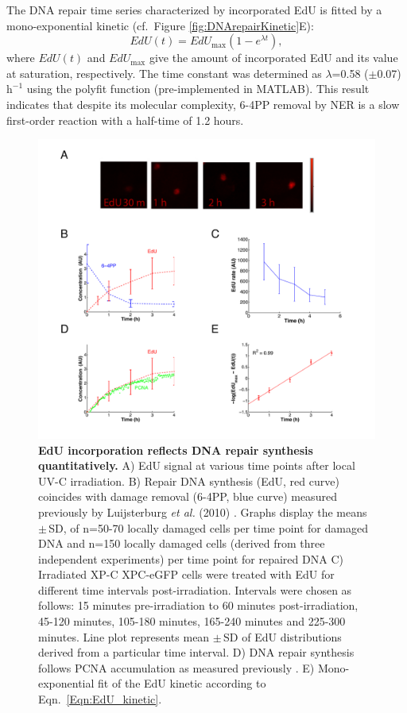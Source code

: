The DNA repair time series characterized by incorporated EdU is fitted by a mono-exponential kinetic (cf.\ Figure \ref{fig:DNArepairKinetic}E):
\begin{equation}
EdU(t) = EdU_\text{max}(1 - e^{\lambda t}),
\label{Eqn:EdU_kinetic}
\end{equation}  
where $EdU(t)$ and $EdU_{\text{max}}$ give the amount of incorporated EdU and its value at saturation, respectively. The time constant was determined as $\lambda$=0.58 ($\pm$0.07) $\text{h}^{-\text{1}}$ using the polyfit function (pre-implemented in MATLAB). This result indicates that despite its molecular complexity, 6-4PP removal by NER is a slow first-order reaction with a half-time of 1.2 hours. \\
        
\begin{figure}[b!]
\begin{center}
\includegraphics[width=1\textwidth]{Abbildungen/figure2_4.pdf}
\caption{\textbf{EdU incorporation reflects DNA repair synthesis quantitatively.} A) EdU signal at various time points after local UV-C irradiation. B) Repair DNA synthesis (EdU, red curve) coincides with damage removal (6-4PP, blue curve) measured previously by Luijsterburg \textit{et al.} (2010) \cite{Luijsterburg2010}. Graphs display the means $\pm$\,SD, of n=50-70 locally damaged cells per time point for damaged DNA and n=150 locally damaged cells (derived from three independent experiments) per time point for repaired DNA C) Irradiated XP-C XPC-eGFP cells were treated with EdU for different time intervals post-irradiation. Intervals were chosen as follows: 15 minutes pre-irradiation to 60 minutes post-irradiation, 45-120 minutes, 105-180 minutes, 165-240 minutes and 225-300 minutes. Line plot represents mean $\pm$\,SD of EdU distributions derived from a particular time interval. D) DNA repair synthesis follows PCNA accumulation as measured previously \cite{Luijsterburg2010}. E) Mono-exponential fit of the EdU kinetic according to Eqn.\ \ref{Eqn:EdU_kinetic}.}

\end{center}
\end{figure}
